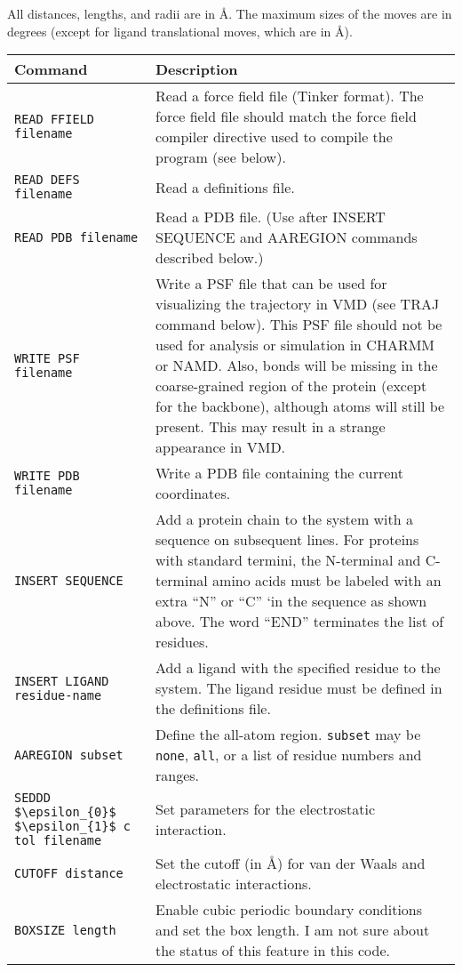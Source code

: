 \documentclass{article}      %
\begin{document}
All distances, lengths, and radii are in \AA.  The maximum sizes of the moves are in degrees (except for ligand translational moves, which are in \AA).

\begin{longtable}{|l|p{3.25in}|}
\hline
Command & Description \\
\hline
\verb+READ FFIELD filename+ & Read a force field file (Tinker format).  The force field file should match the force field compiler directive used to compile the program (see below).   \\
\hline
\verb+READ DEFS filename+ & Read a definitions file. \\
\hline
\verb+READ PDB filename+ & Read a PDB file. (Use after INSERT SEQUENCE and AAREGION commands described below.) \\
\hline
\verb+WRITE PSF filename+ & Write a PSF file that can be used for visualizing the trajectory in VMD (see TRAJ command below).  This PSF file should not be used for analysis or simulation in CHARMM or NAMD.  Also, bonds will be missing in the coarse-grained region of the  protein (except for the backbone), although atoms will still be present.  This may result in a strange appearance in VMD. \\ 
\hline
\verb+WRITE PDB filename+ & Write a PDB file containing the current coordinates. \\
\hline
\verb+INSERT SEQUENCE+ & Add a protein chain to the system with a sequence on subsequent lines.  For proteins with standard termini, the N-terminal and C-terminal amino acids must be labeled with an extra ``N'' or ``C'' `in the sequence as shown above.  The word ``END'' terminates the list of residues. \\
\hline
\verb+INSERT LIGAND residue-name+ & Add a ligand with the specified residue to the system.  The ligand residue must be defined in the definitions file.\\
\hline
\verb+AAREGION subset+ & Define the all-atom region.  \verb+subset+ may be \verb+none+, \verb+all+, or a list of residue numbers and ranges. \\
\hline
\verb+SEDDD $\epsilon_{0}$ $\epsilon_{1}$ c tol filename +& Set parameters for the electrostatic interaction. \\
\hline
\verb+CUTOFF distance+& Set the cutoff (in \AA) for van der Waals and electrostatic interactions. \\
\hline
\verb+BOXSIZE length+& Enable cubic periodic boundary conditions and set the box length.  I am not sure about the status of this feature in this code. \\

\end{longtable}
\end{document}
